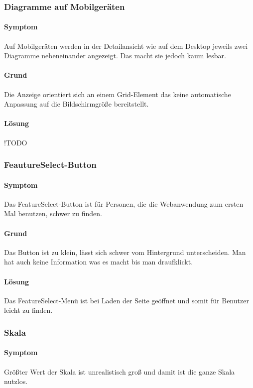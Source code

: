 \subsubsection{Diagramme auf Mobilgeräten}
\paragraph{Symptom}
Auf Mobilgeräten werden in der Detailansicht wie auf dem Desktop jeweils zwei Diagramme nebeneinander angezeigt.
Das macht sie jedoch kaum lesbar.

\paragraph{Grund}
Die Anzeige orientiert sich an einem Grid-Element das keine automatische Anpassung auf 
die Bildschirmgröße bereitstellt.

\paragraph{Lösung}
!TODO

\subsubsection{FeautureSelect-Button}
\paragraph{Symptom}
Das FeatureSelect-Button ist für Personen, die die Webanwendung zum ersten Mal benutzen, schwer zu finden.  

\paragraph{Grund}
Das Button ist zu klein, lässt sich schwer vom Hintergrund unterscheiden. Man hat auch keine Information was es macht bis man draufklickt.

\paragraph{Lösung}
Das FeatureSelect-Menü ist bei Laden der Seite geöffnet und somit für Benutzer leicht zu finden.

\subsubsection{Skala}
\paragraph{Symptom}
Größter Wert der Skala ist unrealistisch groß und damit ist die ganze Skala nutzlos.

